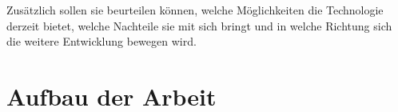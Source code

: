 Zusätzlich sollen sie beurteilen können, welche Möglichkeiten die Technologie derzeit bietet, welche Nachteile sie mit sich bringt und in welche Richtung sich die weitere Entwicklung bewegen wird.


\section{Aufbau der Arbeit}

